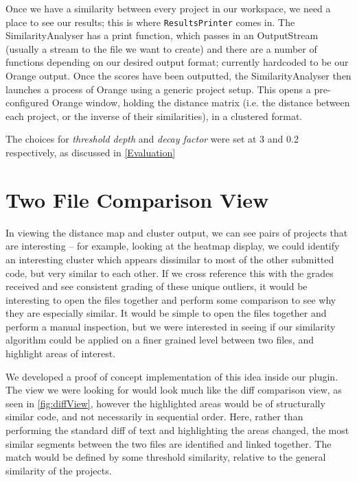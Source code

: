 Once we have a similarity between every project in our workspace, we need a place
to see our results; this is where 
\texttt{ResultsPrinter} comes in.
The SimilarityAnalyser has a print function, which
passes in an OutputStream (usually a stream to the file we want to create) and
there are a number of functions depending on our desired output format; currently
hardcoded to be our Orange output. Once the scores have been outputted, the SimilarityAnalyser
then launches a process of Orange using a generic project setup. This opens a pre-
configured Orange window, holding the distance matrix (i.e. the distance between
each project, or the inverse of their similarities), in a clustered format.

The choices for \emph{threshold depth} and \emph{decay factor} were set at 3 and 0.2
respectively, as discussed in \cref{Evaluation}

\section{Two File Comparison View}
\label{sec:Two File Comparison View}

In viewing the distance map and cluster output, we can see pairs of projects that are
interesting -- for example, looking at the heatmap display,
we could identify an interesting cluster which
appears dissimilar to most of the other submitted code, but very similar to
each other. If we cross reference this with the grades received and see
consistent grading of these unique outliers, it would be interesting to open
the files together and perform some comparison to see why they are especially
similar. It would be simple to open the files together and perform a manual
inspection, but we were interested in seeing if our similarity algorithm could
be applied on a finer grained level between two files, and highlight areas
of interest.

We developed a proof of concept implementation of this idea inside our plugin.
The view we were looking for would look much like the diff comparison view,
as seen in \cref{fig:diffView}, however the highlighted areas would
be of structurally similar code, and not necessarily in sequential order. Here,
rather than performing the standard diff of text and highlighting the areas
changed, the most similar segments between the two files are identified and
linked together. The match would be defined by some threshold similarity, relative
to the general similarity of the projects.

